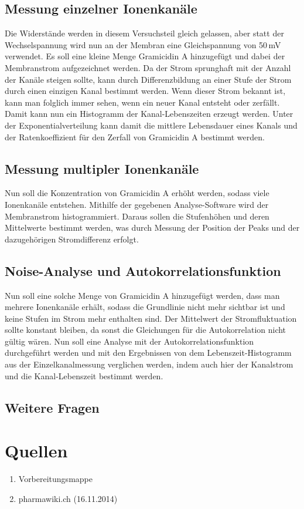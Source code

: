 \documentclass[a4paper,ngerman]{scrartcl}
\begin{document}
\subsection{Messung einzelner Ionenkanäle}
\label{sec:singlechannels}
Die Widerstände werden in diesem Versuchsteil gleich gelassen, aber statt der Wechselspannung wird nun an der Membran eine Gleichspannung 
von 50\,mV verwendet. Es soll eine kleine Menge Gramicidin A hinzugefügt und dabei der Membranstrom aufgezeichnet werden. Da der Strom 
sprunghaft mit der Anzahl der Kanäle steigen sollte, kann durch Differenzbildung an einer Stufe der Strom durch einen einzigen Kanal bestimmt werden. Wenn dieser Strom bekannt ist, kann man folglich immer sehen, wenn ein neuer Kanal entsteht oder zerfällt.\\

Damit kann nun ein Histogramm der Kanal-Lebenszeiten erzeugt werden. Unter der Exponentialverteilung kann damit die mittlere Lebensdauer 
eines Kanals und der Ratenkoeffizient für den Zerfall von Gramicidin A bestimmt werden.

\subsection{Messung multipler Ionenkanäle}
\label{sec:multiplechannels}
Nun soll die Konzentration von Gramicidin A erhöht werden, sodass viele Ionenkanäle entstehen. Mithilfe der gegebenen Analyse-Software
wird der Membranstrom histogrammiert. Daraus sollen die Stufenhöhen und deren Mittelwerte bestimmt werden, was durch Messung der Position der Peaks und der dazugehörigen Stromdifferenz erfolgt.

\subsection{Noise-Analyse und Autokorrelationsfunktion}
\label{sec:noise-autocorr}
Nun soll eine solche Menge von Gramicidin A hinzugefügt werden, dass man mehrere Ionenkanäle erhält, sodass die Grundlinie nicht 
mehr sichtbar ist und keine Stufen im Strom mehr enthalten sind. Der Mittelwert der Stromfluktuation sollte konstant bleiben, da sonst
die Gleichungen für die Autokorrelation nicht gültig wären. Nun soll eine Analyse mit der Autokorrelationsfunktion durchgeführt werden und
mit den Ergebnissen von dem Lebenszeit-Histogramm aus der Einzelkanalmessung verglichen werden, indem auch hier der Kanalstrom und die Kanal-Lebenszeit bestimmt werden. 
\subsection{Weitere Fragen}
\label{sec:weitere-fragen}















\section{Quellen}
\begin{enumerate}
\item Vorbereitungsmappe \label{ref:mappe}
\item pharmawiki.ch (16.11.2014) \label{ref:pharmawiki}
\end{enumerate}
\end{document}
